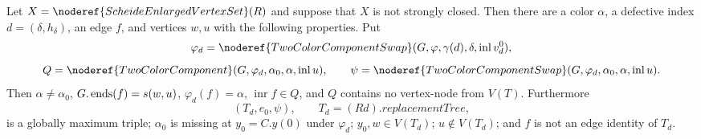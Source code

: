 \begin{helper}
Let $X=\noderef{ScheideEnlargedVertexSet}(R)$ and suppose that $X$ is not
strongly closed.  Then there are a color $\alpha$, a defective index
$d=(\delta,h_\delta)$, an edge $f$, and vertices $w,u$ with the following
properties.  Put
\[
 \varphi_d=\noderef{TwoColorComponentSwap}
 (G,\varphi,\gamma(d),\delta,\operatorname{inl}v^0_d),
\]
\[
 Q=\noderef{TwoColorComponent}
 (G,\varphi_d,\alpha_0,\alpha,\operatorname{inl}u),\qquad
 \psi=\noderef{TwoColorComponentSwap}
 (G,\varphi_d,\alpha_0,\alpha,\operatorname{inl}u).
\]
Then $\alpha\ne\alpha_0$, $G.\mathop{\rm ends}(f)=s(w,u)$,
$\varphi_d(f)=\alpha$, $\operatorname{inr}f\in Q$, and $Q$ contains no
vertex-node from $V(T)$.  Furthermore
\[
 (T_d,e_0,\psi),\qquad T_d=(R d).\mathit{replacementTree},
\]
is a globally maximum triple; $\alpha_0$ is missing at $y_0=C.y(0)$
under $\varphi_d$; $y_0,w\in V(T_d)$; $u\notin V(T_d)$; and $f$ is not
an edge identity of $T_d$.
\end{helper}
